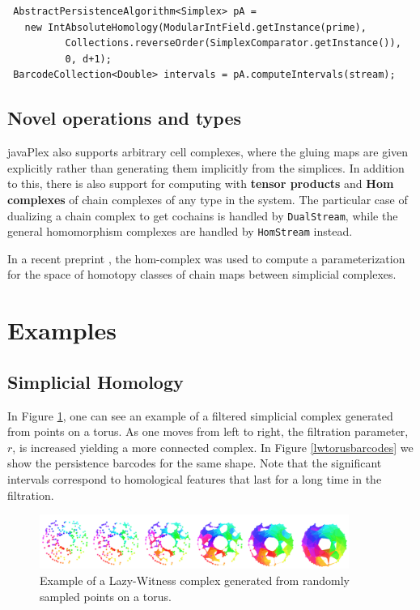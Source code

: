 \begin{verbatim}
 AbstractPersistenceAlgorithm<Simplex> pA = 
   new IntAbsoluteHomology(ModularIntField.getInstance(prime), 
          Collections.reverseOrder(SimplexComparator.getInstance()), 
          0, d+1);
 BarcodeCollection<Double> intervals = pA.computeIntervals(stream);
\end{verbatim}

\subsection{Novel operations and types}
\label{sec:novel-oper-types}

javaPlex also supports arbitrary cell complexes, where the gluing maps
are given explicitly rather than generating them implicitly from the
simplices. In addition to this, there is also support for computing
with \textbf{tensor products} and \textbf{Hom complexes} of chain
complexes of any type in the system. The particular case of dualizing
a chain complex to get cochains is handled by \texttt{DualStream},
while the general homomorphism complexes are handled by
\texttt{HomStream} instead.

In a recent preprint \cite{hom}, the hom-complex was used to compute a parameterization for the space of homotopy classes of chain maps between simplicial complexes.


\section{Examples}

\subsection{Simplicial Homology}

In Figure \ref{lwtorus}, one can see an example of a filtered simplicial complex generated from points on a torus. As one moves from left to right, the filtration parameter, $r$, is increased yielding a more connected complex. In Figure \ref{lwtorusbarcodes} we show the persistence barcodes for the same shape. Note that the significant intervals correspond to homological features that last for a long time in the filtration.

\begin{figure}
\centering
\includegraphics[width=0.9\textwidth]{Adams_Henry/images/tori_small.png}
\caption{Example of a Lazy-Witness complex generated from randomly sampled points on a torus.} \label{lwtorus}
\end{figure}


